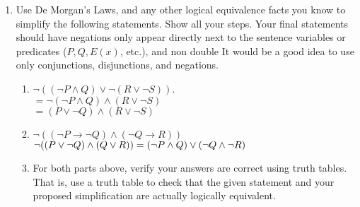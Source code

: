 \documentclass[11pt,a4paper]{article}
\newcommand\setItemNumber[1]{\setcounter{enumi}{\numexpr#1-1\relax}}
\begin{document}
\begin{enumerate}
        \setItemNumber{9}
        \item Use De Morgan’s Laws, and any other logical equivalence facts you know to simplify the following statements. Show all your steps. Your final statements should have negations only appear directly next to the sentence variables or predicates ($P, Q, E(x)$, etc.), and non double It would be a good idea to use only conjunctions, disjunctions, and negations.
            \begin{enumerate}
                \item $\neg((\neg P\land Q)\lor \neg(R\lor\neg S))$.\\
                    $ = \neg(\neg P\land Q) \land (R\lor\neg S)$\\
                    $ = (P\lor\neg Q)\land(R\lor \neg S)$
                \item $\neg((\neg P\rightarrow\neg Q) \land(\neg Q\rightarrow R))$\\
                    $\neg((P\lor\neg Q)\land(Q\lor R))\\ = (\neg P\land Q)\lor(\neg Q\land\neg R)$

                \item For both parts above, verify your answers are correct using truth tables. That is, use a truth table to check that the given statement and your proposed simplification are actually logically equivalent.\\


\end{enumerate}
\end{enumerate}
\end{document}

